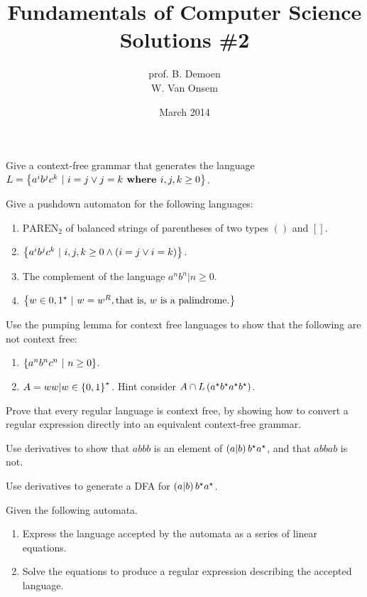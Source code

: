 \documentclass{article}
\title{Fundamentals of Computer Science\\Solutions \#2}
\author{prof. B. Demoen\\W. Van Onsem}
\date{March 2014}
\begin{document}
\maketitle
\begin{exercise}
Give a context-free grammar that generates the language $L=\left\{ a^ib^jc^k\ |\ i=j\vee j=k \mbox{\bf{ where }} i,j,k\geq0 \right\}$.
\end{exercise}

\begin{exercise}
Give a pushdown automaton for the following languages:
\begin{enumerate}
 \item $\mbox{PAREN}_2$ of balanced strings of parentheses of two types $()$ and $[]$.
 \item $\left\{ a^ib^jc^k\ |\ i,j,k\geq0\wedge \left( i=j\vee i=k \right) \right\}$.
 \item The complement of the language ${a^nb^n|n\geq 0}$.
 \item $\left\{ w\in{0,1}^{\star}\ |\ w=w^R, \mbox{that is, $w$ is a palindrome.} \right\}$
\end{enumerate}
\end{exercise}

\begin{exercise}
Use the pumping lemma for context free languages to show that the following are not context free:
\begin{enumerate}
 \item $\left\{ a^nb^nc^n\ |\ n\geq0 \right\}$.
 \item $A = {ww|w\in\left\{ 0,1 \right\}^\star{}}$. Hint consider $A\cap L\left( a^{\star}b^{\star}a^{\star}b^{\star} \right)$.
\end{enumerate}
\end{exercise}

\begin{exercise}
Prove that every regular language is context free, by showing how to convert a regular expression directly into an equivalent context-free grammar.
\end{exercise}

\begin{exercise}
Use derivatives to show that $abbb$ is an element of $\left( a|b \right)b^{\star}a^{\star}$, and that $abbab$ is not.
\end{exercise}

\begin{exercise}
Use derivatives to generate a DFA for $\left( a|b \right)b^{\star}a^{\star}$.
\end{exercise}

\begin{exercise}
Given the following automata.


\begin{enumerate}
 \item Express the language accepted by the automata as a series of linear equations.
 \item Solve the equations to produce a regular expression describing the accepted language.
\end{enumerate}
\end{exercise}
\end{document}
